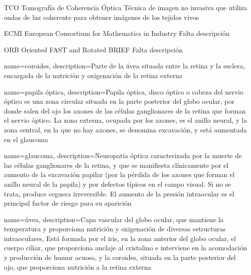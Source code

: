 
  {TCO}            %
  {Tomografía de Coherencia Óptica}  %
  {Técnica de imagen no invasiva que utiliza ondas de luz coherente
    para obtener imágenes de los tejidos vivos} %

  {ECMI}            %
  {European Consortium for Mathematics in Industry}  %
  {Falta descripción} %

  {ORB} %
  {Oriented FAST and Rotated BRIEF} %
  {Falta descripción} %

{
  name={coroides},
  description={Parte de la úvea situada entre la retina y la esclera,
    encargada de la nutrición y oxigenación de la retina externa}
}

{
  name={papila óptica},
  description={Papila óptica, disco óptico o cabeza del nervio óptico
    es una zona circular situada en la parte posterior del globo
    ocular, por donde salen del ojo los axones de las células
    ganglionares de la retina que forman el nervio óptico. La zona
    externa, ocupada por los axones, es el anillo neural, y la zona
    central, en la que no hay axones, se denomina excavación, y está
    aumentada en el glaucoma}
}

{
  name={glaucoma},
  description={Neuropatía óptica caracterizada por la muerte de las
    células ganglionares de la retina, y que se manifiesta
    clínicamente por el aumento de la excavación papilar (por la
    pérdida de los axones que forman el anillo neural de la papila) y
    por defectos típicos en el campo visual. Si no se trata, produce
    ceguera irreversible. El aumento de la presión intraocular es el
    principal factor de riesgo para su aparición}
}

{
  name={úvea},
  description={Capa vascular del globo ocular, que mantiene la
    temperatura y proporciona nutrición y oxigenación de diversas
    estructuras intraoculares, Está formada por el iris, en la zona
    anterior del globo ocular, el cuerpo ciliar, que proporciona
    anclaje al cristalino e interviene en la acomodación y producción
    de humor acuoso, y la coroides, situada en la parte posterior del
    ojo, que proporciona nutrición a la retina externa}
}


